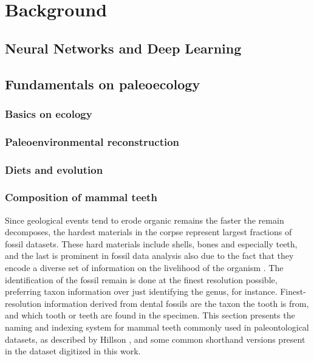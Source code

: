 \documentclass[english,twoside,openright]{HYgraduMLDS}
\begin{document}
\section{Background}

\subsection{Neural Networks and Deep Learning}

\subsection{Fundamentals on paleoecology}

\subsubsection{Basics on ecology}

\subsubsection{Paleoenvironmental reconstruction}

\subsubsection{Diets and evolution}

\subsubsection{Composition of mammal teeth}


Since geological events tend to erode organic remains the faster the remain decomposes, the hardest materials in 
the corpse represent largest fractions of fossil datasets. These hard materials include shells, bones and especially teeth, and 
the last is prominent in fossil data analysis also due to the fact that they encode a diverse set of information on 
the livelihood of the organism \cite{Faith_Lyman_2019}. The identification of the fossil remain is done at the finest resolution possible,
preferring taxon information over just identifying the genus, for instance. Finest-resolution information 
derived from dental fossils are the taxon the tooth is from, and which tooth or teeth are found in the specimen.
This section presents the naming and indexing system for mammal teeth commonly used in paleontological datasets,
as described by Hillson \cite{Hillson_2005}, and some common shorthand versions present in the dataset digitized in this work.
\end{document}
